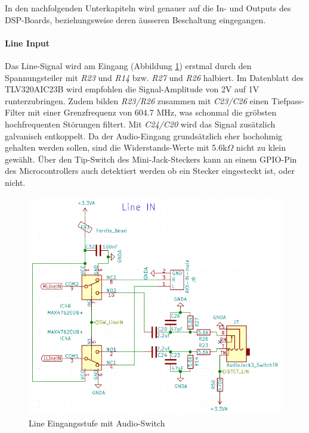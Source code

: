 In den nachfolgenden Unterkapiteln wird genauer auf die In- und Outputs des DSP-Boards, beziehungsweise deren äusseren Beschaltung eingegangen.


\paragraph{Line Input}
\label{par:LineIN}
Das Line-Signal wird am Eingang (Abbildung \ref{fig:Schema_LineIN}) erstmal durch den Spannungsteiler mit \textit{R23} und \textit{R14} bzw. \textit{R27} und \textit{R26} halbiert. Im Datenblatt des TLV320AIC23B \cite{tlv320} wird empfohlen die Signal-Amplitude von 2V auf 1V runterzubringen. Zudem bilden \textit{R23/R26} zusammen mit \textit{C23/C26}  einen Tiefpass-Filter mit einer Grenzfrequenz von 604.7 MHz, was schonmal die gröbsten hochfrequenten Störungen filtert. Mit \textit{C24/C20} wird das Signal zusätzlich galvanisch entkoppelt. Da der Audio-Eingang grundsätzlich eher hochohmig gehalten werden sollen, sind die Widerstands-Werte mit 5.6k$\Omega$ nicht zu klein gewählt. \cite{book:douglas}
Über den Tip-Switch des Mini-Jack-Steckers kann an einem GPIO-Pin des Microcontrollers auch detektiert werden ob ein Stecker eingesteckt ist, oder nicht.

\begin{figure} [H]
\begin{center}
 \includegraphics[scale=0.5]{../graphics/Schema_LineIN.png}
\caption{Line Eingangsstufe mit Audio-Switch}
\label{fig:Schema_LineIN}
\end{center}
\end{figure}

